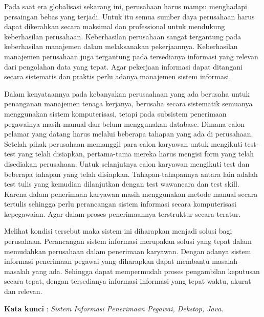 \documentclass{jtetiproposalskripsi}
\begin{document}
\cover

\approvalpage


\begin{abstractind}
Pada saat era globalisasi sekarang ini, perusahaan harus mampu menghadapi persaingan bebas yang terjadi. Untuk itu semua sumber daya perusahaan harus dapat dikerahkan secara maksimal dan professional untuk mendukung keberhasilan perusahaan. Keberhasilan perusahaan sangat tergantung pada keberhasilan manajemen dalam melaksanakan pekerjaannya. Keberhasilan manajemen perusahaan juga tergantung pada tersedianya informasi yang relevan dari pengolahan data yang tepat. Agar pekerjaan informasi dapat ditangani secara sistematis dan praktis perlu adanya manajemen sistem informasi. 

Dalam kenyataannya pada kebanyakan perusaahaan yang ada berusaha untuk penanganan manajemen tenaga kerjanya, berusaha secara sistematik semuanya menggunakan sistem komputerisasi, tetapi pada subsistem penerimaan pegawainya masih manual dan belum menggunakan database. Dimana calon pelamar yang datang harus melalui beberapa tahapan yang ada di perusahaan. Setelah pihak perusahaan memanggil para calon karyawan untuk mengikuti test-test yang telah disiapkan, pertama-tama mereka harus mengisi form yang telah disediakan perusahaan. Untuk selanjutnya calon karyawan mengikuti test dan beberapa tahapan yang telah disiapkan. Tahapan-tahapannya antara lain adalah test tulis yang kemudian dilanjutkan dengan test wawancara dan test skill. Karena dalam penerimaan karyawan masih menggunakan metode manual secara tertulis sehingga perlu perancangan sistem informasi secara komputerisasi kepegawaian. Agar dalam proses penerimaannya terstruktur secara teratur.

Melihat kondisi tersebut maka sistem ini diharapkan menjadi solusi bagi perusahaan. Perancangan sistem informasi merupakan solusi yang tepat dalam memudahkan perusahaan dalam penerimaan karyawan. Dengan adanya sistem informasi penerimaan pegawai yang diharapkan dapat membantu masalah-masalah yang ada. Sehingga dapat mempermudah proses pengambilan keputusan secara tepat, dengan tersedianya informasi-informasi yang tepat waktu, akurat dan relevan.


\bigskip
\textbf{Kata kunci} : \emph{Sistem Informasi Penerimaan Pegawai, Dekstop, Java.}
\end{abstractind}
\end{document}
